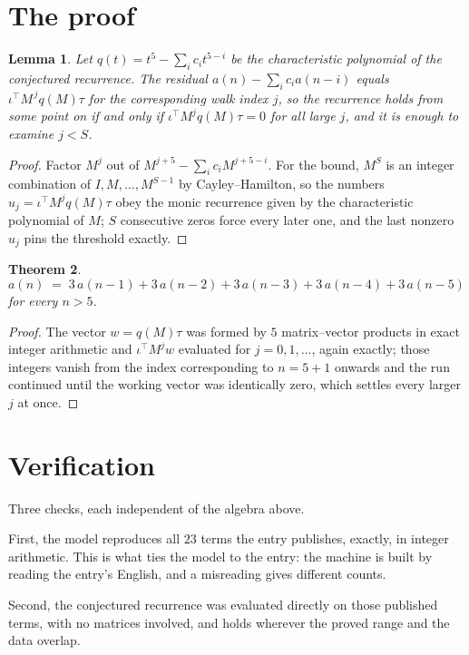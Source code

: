 \documentclass[11pt,a4paper]{article}
\theoremstyle{plain}
\newtheorem{theorem}{Theorem}
\newtheorem{lemma}[theorem]{Lemma}
\theoremstyle{definition}
\begin{document}
\section{The proof}

\begin{lemma}\label{lem:crit}
Let $q(t)=t^{5}-\sum_i c_it^{5-i}$ be the characteristic polynomial of the
conjectured recurrence. The residual $a(n)-\sum_ic_ia(n-i)$ equals
$\iota^{\!\top}M^{\,j}q(M)\tau$ for the corresponding walk index $j$, so the recurrence
holds from some point on if and only if $\iota^{\!\top}M^{j}q(M)\tau=0$ for all large $j$,
and it is enough to examine $j<S$.
\end{lemma}

\begin{proof}
Factor $M^{j}$ out of $M^{j+5}-\sum_ic_iM^{j+5-i}$. For the bound, $M^{S}$
is an integer combination of $I,M,\dots,M^{S-1}$ by Cayley--Hamilton, so the numbers
$u_j=\iota^{\!\top}M^{j}q(M)\tau$ obey the monic recurrence given by the characteristic
polynomial of $M$; $S$ consecutive zeros force every later one, and the last nonzero $u_j$
pins the threshold exactly.
\end{proof}

\begin{theorem}
\[
a(n)\;=\;3\,a(n-1) + 3\,a(n-2) + 3\,a(n-3) + 3\,a(n-4) + 3\,a(n-5)
\]
for every $n>5$.
\end{theorem}

\begin{proof}
The vector $w=q(M)\tau$ was formed by $5$ matrix--vector products in exact integer
arithmetic and $\iota^{\!\top}M^{j}w$ evaluated for $j=0,1,\dots$, again exactly; those
integers vanish from the index corresponding to $n=5+1$ onwards and the run continued
until the working vector was identically zero, which settles every larger $j$ at once.
\end{proof}

\section{Verification}

Three checks, each independent of the algebra above.

First, the model reproduces all $23$ terms the entry publishes, exactly, in integer
arithmetic. This is what ties the model to the entry: the machine is built by reading the
entry's English, and a misreading gives different counts.

Second, the conjectured recurrence was evaluated directly on those published terms, with no
matrices involved, and holds wherever the proved range and the data overlap.
\end{document}
